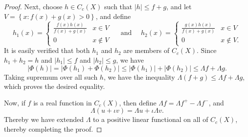 \documentclass[11pt]{article}
\theoremstyle{thmstyle}
\theoremstyle{defstyle}
\renewcommand{\le}{\leqslant}
\begin{document}
\begin{proof}
    Next, choose $h\in C_c(X)$ such that $|h|\le f + g$, and let $V = \left\{x\colon f(x) + g(x) > 0\right\}$, and define 
    \begin{equation*}
        h_1(x) = \begin{cases}
            \frac{f(x)h(x)}{f(x) + g(x)} & x\in V\\
            0 & x\notin V
        \end{cases}
        \quad\text{ and }\quad 
        h_2(x) = \begin{cases}
            \frac{g(x)h(x)}{f(x) + g(x)} & x\in V\\
            0 & x\notin V.
        \end{cases}
    \end{equation*}
    It is easily verified that both $h_1$ and $h_2$ are members of $C_c(X)$. Since $h_1 + h_2 = h$ and $|h_1|\le f$ and $|h_2|\le g$, we have 
    \begin{equation*}
        |\Phi(h)| = \left|\Phi(h_1) + \Phi(h_2)\right|\le |\Phi(h_1)| + |\Phi(h_2)|\le\Lambda f + \Lambda g.
    \end{equation*}
    Taking supremum over all such $h$, we have the inequality $\Lambda(f + g)\le\Lambda f + \Lambda g$, which proves the desired equality.

    Now, if $f$ is a real function in $C_c(X)$, then define $\Lambda f = \Lambda f^+ - \Lambda f^-$, and 
    \begin{equation*}
        \Lambda (u + \iota v) = \Lambda u + \iota\Lambda v.
    \end{equation*}
    Thereby we have extended $\Lambda$ to a positive linear functional on all of $C_c(X)$, thereby completing the proof.
\end{proof}



\end{document}

